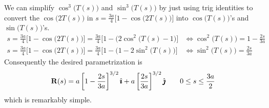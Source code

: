 \begin{eg}
We can simplify $\cos^3\big(T(s)\big)$ and $\sin^3\big(T(s)\big)$
by just using trig identities to convert the  $\cos\big(2T(s)\big)$
in $s=\frac{3a}{4}\big[1-\cos\big(2T(s)\big)\big]$
into $\cos\big(T(s)\big)$'s and $\sin\big(T(s)\big)$'s.
\begin{align*}
s=\frac{3a}{4}\big[1-\cos\big(2T(s)\big)\big]
=\frac{3a}{4}\big[1-\big(2\cos^2\big(T(s)-1\big)\big]
&\iff \cos^2\big(T(s)\big)=1-\frac{2s}{3a} \\
s=\frac{3a}{4}\big[1-\cos\big(2T(s)\big)\big]
=\frac{3a}{4}\big[1-\big(1-2\sin^2\big(T(s)\big)\big]
&\iff \sin^2\big(T(s)\big)=\frac{2s}{3a}
\end{align*}
Consequently the desired parametrization is
\begin{equation*}
\mathbf{R}(s) = a\left[1-\frac{2s}{3a}\right]^{3/2}\hat{\pmb{\imath}}
        + a\left[\frac{2s}{3a}\right]^{3/2}\hat{\pmb{\jmath}}
\qquad
0\le s \le \frac{3a}{2}
\end{equation*}
which is remarkably simple.
\end{eg}

